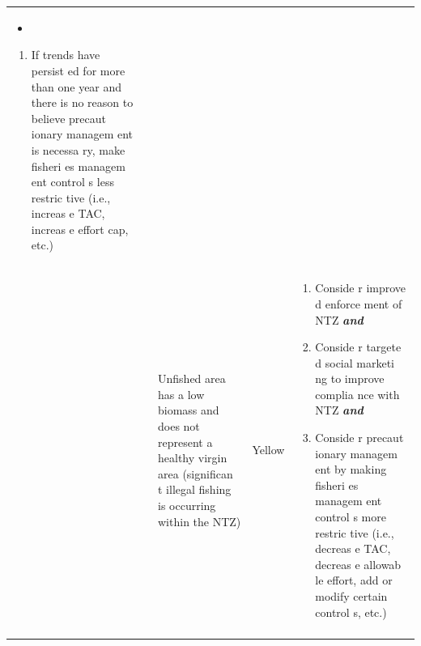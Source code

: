 \documentclass[]{book}
\providecommand{\tightlist}{%
  \setlength{\itemsep}{0pt}\setlength{\parskip}{0pt}}
\begin{document}
\begin{longtable}[]{@{}lllll@{}}
\begin{minipage}[t]{0.19\columnwidth}
\begin{itemize}
\item
\end{itemize}

\begin{enumerate}
\def\labelenumi{\arabic{enumi}.}
\tightlist
\item
  If trends have persist ed for more than one year and there is no
  reason to believe precaut ionary managem ent is necessa ry, make
  fisheri es managem ent control s less restric tive (i.e., increas e
  TAC, increas e effort cap, etc.)
\end{enumerate}\strut
\end{minipage}\tabularnewline
\begin{minipage}[t]{0.19\columnwidth}\raggedright\strut
\strut
\end{minipage} & \begin{minipage}[t]{0.19\columnwidth}\raggedright\strut
\strut
\end{minipage} & \begin{minipage}[t]{0.19\columnwidth}\raggedright\strut
Unfished area has a low biomass and does not represent a healthy virgin
area (significan t illegal fishing is occurring within the NTZ)\strut
\end{minipage} & \begin{minipage}[t]{0.19\columnwidth}\raggedright\strut
Yellow\strut
\end{minipage} & \begin{minipage}[t]{0.19\columnwidth}\raggedright\strut
\begin{enumerate}
\def\labelenumi{\arabic{enumi}.}
\item
  Conside r improve d enforce ment of NTZ \textbf{\emph{and} }
\item
  Conside r targete d social marketi ng to improve complia nce with NTZ
  \textbf{\emph{and} }
\item
  Conside r precaut ionary managem ent by making fisheri es managem ent
  control s more restric tive (i.e., decreas e TAC, decreas e allowab le
  effort, add or modify certain control s, etc.)
\end{enumerate}\strut
\end{minipage}\tabularnewline
\begin{minipage}[t]{0.19\columnwidth}\raggedright\strut
\strut
\end{minipage} & \begin{minipage}[t]{0.19\columnwidth}\raggedright\strut
\strut
\end{minipage} & \begin{minipage}[t]{0.19\columnwidth}\raggedright\strut

\end{minipage}
\end{longtable}
\end{document}
